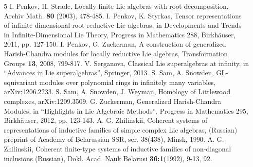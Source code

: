 \documentclass{svmult}
\begin{document}
\begin{thebibliography}{5}
 I. Penkov, H. Strade, Locally finite Lie algebras with root decomposition, Archiv Math. \textbf{80} (2003), 478-485. 
\vspace{0.2cm}
 I. Penkov, K. Styrkas, Tensor representations of infinite-dimensional root-reductive Lie algebras, in Developments and Trends in Infinite-Dimensional Lie Theory, Progress in Mathematics 288, Birkh\"auser, 2011, pp. 127-150.
\vspace{0.2cm}
 I. Penkov, G. Zuckerman, A construction of generalized Harish-Chandra modules for locally reductive Lie algebras, Transformation Groups \textbf{13}, 2008, 799-817.
\vspace{0.2cm}
 V. Serganova, Classical Lie superalgebras at infinity, in ``Advances in Lie superalgebras'',
Springer, 2013.
\vspace{0.2cm}
 S. Sam, A. Snowden, GL-equivariant modules over polynomial rings in infinitely many variables, arXiv:1206.2233.
\vspace{0.2cm}
 S. Sam, A. Snowden, J. Weyman, Homology of Littlewood complexes, arXiv:1209.3509.
\vspace{0.2cm}
 G. Zuckerman, Generalized Harish-Chandra Modules, in ``Highlights in Lie Algebraic Methods'', Progress in Mathematics 295, Birkh\"{a}user, 2012, pp. 123-143.
\vspace{0.2cm}
 A. G. Zhilinskii, Coherent systems of representations of inductive families of simple complex Lie algebras, (Russian) preprint of Academy of Belarussian SSR, ser. 38(438), Minsk, 1990.
\vspace{0.2cm}
 A. G. Zhilinskii, Coherent finite-type systems of inductive families of non-diagonal inclusions (Russian), Dokl. Acad. Nauk Belarusi \textbf{36:1}(1992), 9-13, 92.
\end{thebibliography}
\end{document}
